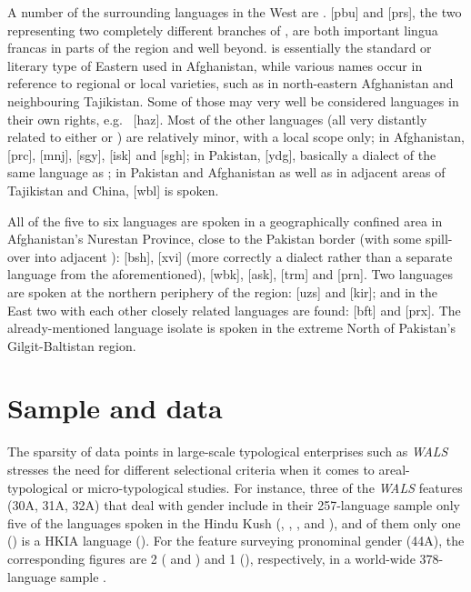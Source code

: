 \documentclass[output=collectionpaper]{langsci/langscibook}
\begin{document}
A number of the surrounding languages in the West are .  [pbu] and  [prs], the two representing two completely different branches of , are both important lingua francas in parts of the region and well beyond.  is essentially the standard or literary type of Eastern  used in Afghanistan, while various names occur in reference to regional or local varieties, such as  in north-eastern Afghanistan and neighbouring Tajikistan. Some of those may very well be considered languages in their own rights, e.g.\  [haz]. Most of the other  languages (all very distantly related to either  or ) are relatively minor, with a local scope only; in Afghanistan,  [prc],  [mnj],  [sgy],  [isk] and  [sgh]; in Pakistan,  [ydg], basically a dialect of the same language as ; in Pakistan and Afghanistan as well as in adjacent areas of Tajikistan and China,  [wbl] is spoken.

All of the five to six  languages are spoken in a geographically confined area in Afghanistan's Nurestan Province, close to the Pakistan border (with some spill-over into adjacent ):  [bsh],  [xvi] (more correctly a dialect rather than a separate language from the aforementioned),  [wbk],  [ask],  [trm] and  [prn]. Two  languages are spoken at the northern periphery of the region:  [uzs] and  [kir]; and in the East two with each other closely related  languages are found:  [bft] and  [prx]. The already-mentioned language isolate  is spoken in the extreme North of Pakistan's Gilgit-Baltistan region.

\section{Sample and data}
The sparsity of data points in large-scale typological enterprises such as \textit{WALS} stresses the need for different selectional criteria when it comes to areal\hyp{}typological or micro-typological studies. For instance, three of the \textit{WALS} features (30A, 31A, 32A) that deal with gender include in their 257-language sample only five of the languages spoken in the Hindu Kush (, , ,  and ), and of them only one () is a HKIA language (\citealt{Corbett2013,Corbett2013a,Corbett2013b}). For the feature surveying pronominal gender (44A), the corresponding figures are 2 ( and ) and 1 (), respectively, in a world-wide 378-language sample \citep{Siewierska2013}.
\end{document}
